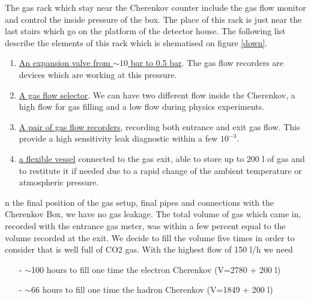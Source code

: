\documentclass[12pt]{article}
\begin{document}

The gas rack which stay near the Cherenkov counter include the gas flow
 monitor and control the inside pressure of the box. The place of this rack is
just near the last stairs which go on the platform of the detector house. The
following list describe the elements of this rack which is shematised on
 figure \ref{down}.
\begin{enumerate}
\item \underline{An expansion valve from $\sim 10$ bar to 0.5 bar}. The
 gas flow recorders are devices which are working at this pressure.
\item \underline{A gas flow selector}. We can have two different flow
 inside the Cherenkov, a high flow for gas filling and a low flow 
during physics experiments. 
\item \underline{A pair of gas flow recorders}, recording both entrance 
and exit gas flow.
This provide a high sensitivity leak diagnostic within a few $10^{-3}$.
\item \underline{a flexible vessel} connected to the gas exit, able to 
store up to 200 l of gas and to restitute it if needed due to a rapid change 
of the ambient temperature or atmospheric pressure.
\end{enumerate}


n the final position of the gas setup, final pipes and connections with the
 Cherenkov Box, we have no gas leakage. The total volume of gas which came in, 
recorded with the entrance gas meter, was within a few percent equal to the
volume recorded at the exit.
We decide to fill the volume five times 
in order to consider that is well full of CO2 gas. 
With the highest flow of 150 l/h we need 
\begin{itemize}
\item[-] $\sim$100 hours to fill one time the electron Cherenkov
 (V=2780 + 200 l)
\item[-] $\sim$66 hours to fill one time the hadron Cherenkov 
(V=1849 + 200 l)
\end{itemize}
\end{document}
